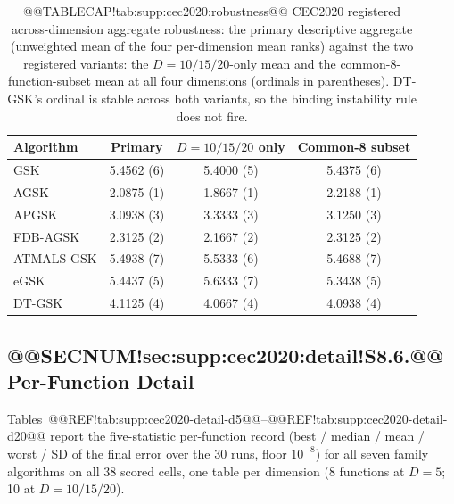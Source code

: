 \documentclass[10pt,a4paper]{article}
\newcommand{\dtgsk}{DT-GSK}
\begin{document}
\begin{table}[H]
\caption{@@TABLECAP!tab:supp:cec2020:robustness@@ CEC2020 registered across-dimension aggregate robustness: the
primary descriptive aggregate (unweighted mean of the four per-dimension
mean ranks) against the two registered variants: the $D = 10/15/20$-only
mean and the common-8-function-subset mean at all four dimensions
(ordinals in parentheses).  \dtgsk{}'s ordinal is stable across both
variants, so the binding instability rule does not fire.
}\label{tab:supp:cec2020:robustness}


\zebra
\begin{tabular}{lccc}
\toprule
\textbf{Algorithm} & \textbf{Primary} & \textbf{$D=10/15/20$ only} &
\textbf{Common-8 subset} \\
\midrule
GSK & 5.4562 (6) & 5.4000 (5) & 5.4375 (6) \\
AGSK & 2.0875 (1) & 1.8667 (1) & 2.2188 (1) \\
APGSK & 3.0938 (3) & 3.3333 (3) & 3.1250 (3) \\
FDB-AGSK & 2.3125 (2) & 2.1667 (2) & 2.3125 (2) \\
ATMALS-GSK & 5.4938 (7) & 5.5333 (6) & 5.4688 (7) \\
eGSK & 5.4437 (5) & 5.6333 (7) & 5.3438 (5) \\
DT-GSK & 4.1125 (4) & 4.0667 (4) & 4.0938 (4) \\
\bottomrule
\end{tabular}
\end{table}

\subsection{@@SECNUM!sec:supp:cec2020:detail!S8.6.@@ Per-Function Detail}\label{sec:supp:cec2020:detail}

Tables~@@REF!tab:supp:cec2020-detail-d5@@--@@REF!tab:supp:cec2020-detail-d20@@
report the five-statistic per-function record (best / median / mean /
worst / SD of the final error over the 30 runs, floor $10^{-8}$) for all
seven family algorithms on all 38 scored cells, one table per dimension
(8 functions at $D = 5$; 10 at $D = 10/15/20$).
\end{document}
